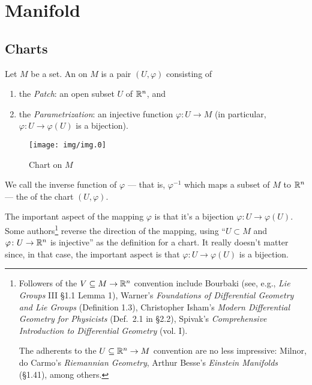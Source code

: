 \section{Manifold}
\subsection{Charts}

\begin{definition}
Let $M$ be a set. An  on $M$
is a pair $(U,\varphi)$ consisting of
\begin{enumerate}
\item the \emph{Patch}: an open subset $U$ of $\mathbb{R}^{n}$, and
\item the \emph{Parametrization}: an injective function $\varphi\colon U\to M$
  (in particular, $\varphi\colon U\to \varphi(U)$ is a bijection).
\end{enumerate}
\end{definition}

\begin{figure}[H]
  \centering
  \texttt{[image: img/img.0]}
  \caption{Chart on $M$}
\end{figure}

\begin{remark}\label{rmk:chart:local-coordinates}
We call the inverse function of $\varphi$ --- that is, $\varphi^{-1}$
which maps a subset of $M$ to $\mathbb{R}^{n}$ --- the 
of the chart $(U,\varphi)$.
\end{remark}

\begin{remark}
The important aspect of the mapping $\varphi$ is that it's a bijection
$\varphi\colon U\to\varphi(U)$. Some authors\footnote{Followers of the
$V\subseteq M\to\mathbb{R}^{n}$ convention include Bourbaki (see, e.g., \textit{Lie Groups} III \S1.1 Lemma 1),
Warner's \textit{Foundations of Differential Geometry and Lie Groups}
(Definition 1.3), Christopher Isham's
\textit{Modern Differential Geometry for Physicists} (Def.~2.1 in \S2.2),
Spivak's \textit{Comprehensive Introduction to Differential Geometry} (vol. I).

The adherents to the $U\subseteq\mathbb{R}^{n}\to M$ convention are no less
impressive: Milnor, do Carmo's \textit{Riemannian Geometry}, Arthur Besse's
\textit{Einstein Manifolds} (\S1.41), among others.}
reverse the direction of the mapping, using ``$U\subset M$ and
$\varphi\colon U\to\mathbb{R}^{n}$ is injective'' as the definition for a
chart. It really doesn't matter since, in that case, the important
aspect is that $\varphi\colon U\to\varphi(U)$ is a bijection.
\end{remark}

